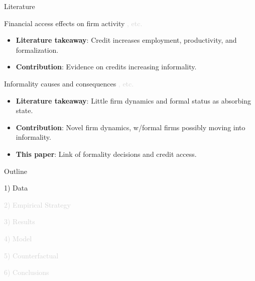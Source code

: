 \documentclass[aspectratio=169]{beamer}
\begin{document}
\begin{frame}{Literature}

Financial access effects on firm activity \textcolor{lightgray}{\citep{amiti2018much,greenstone2020credit,gutierrez2023credit,khwaja2008tracing,chodorow2014employment}, etc.}
 \begin{itemize}
    \item \textbf{Literature takeaway}: Credit increases employment, productivity, and formalization.
    \item \textbf{Contribution}: Evidence on credits increasing informality.
 \end{itemize}

\vspace{10mm}

Informality causes and consequences \textcolor{lightgray}{\citep{ulyssea2018firms,meghir2015wages,la2014informality,almeida2012enforcement,busso2012formal,adom2025structural}, etc.}
\begin{itemize}
    \item \textbf{Literature takeaway}: Little firm dynamics and formal status as absorbing state.
     \item \textbf{Contribution}: Novel firm dynamics, w/formal firms possibly moving into informality.
 \end{itemize}

\vspace{10mm}

\begin{itemize}
    \item[$\Rightarrow$] \Large \textbf{This paper}: Link of formality decisions and credit access. 
\end{itemize}



\end{frame}


\begin{frame}[noframenumbering]{Outline}

\Large

1) Data

\vspace{5mm}

\textcolor{lightgray}{2) Empirical Strategy}

\vspace{5mm}

\textcolor{lightgray}{3) Results}

\vspace{5mm}

\textcolor{lightgray}{4) Model}

\vspace{5mm}

\textcolor{lightgray}{5) Counterfactual}

\vspace{5mm}

\textcolor{lightgray}{6) Conclusions}


\end{frame}
\end{document}
